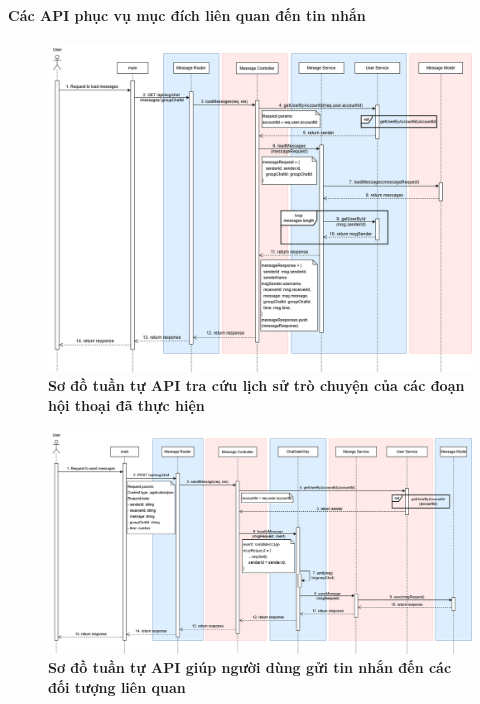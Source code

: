 \paragraph{Các API phục vụ mục đích liên quan đến tin nhắn}
\mbox{}
\begin{figure}[H]
	\centering
	\includegraphics[width=16cm]{Images/api_sequence/chat/loadMessages.drawio.png}
	\caption[Sơ đồ tuần tự API tra cứu lịch sử trò chuyện của các đoạn hội thoại đã thực hiện]{\bfseries \fontsize{12pt}{0pt}\selectfont Sơ đồ tuần tự API tra cứu lịch sử trò chuyện của các đoạn hội thoại đã thực hiện}
	\label{sequence_diagram_load_chat}
\end{figure}

\begin{figure}[H]
	\centering
	\includegraphics[width=16cm]{Images/api_sequence/chat/sendMessage.drawio.png}
	\caption[Sơ đồ tuần tự API giúp người dùng gửi tin nhắn đến các đối tượng liên quan]{\bfseries \fontsize{12pt}{0pt}\selectfont Sơ đồ tuần tự API giúp người dùng gửi tin nhắn đến các đối tượng liên quan}
	\label{sequence_diagram_send_chat}
\end{figure}

